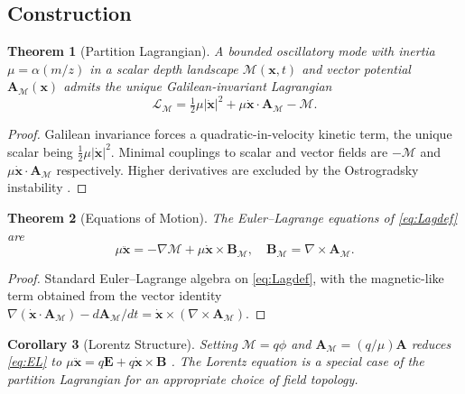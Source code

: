 \documentclass[twocolumn,10pt,a4paper]{article}
\theoremstyle{thmstyle}
\newtheorem{theorem}{Theorem}[section]
\newtheorem{corollary}[theorem]{Corollary}
\theoremstyle{definition}
\theoremstyle{remark}
\newcommand{\Depth}{\mathcal{M}}
\newcommand{\Lagr}{\mathcal{L}}
\newcommand{\partinert}{\mu}
\newcommand{\Apartition}{\mathbf{A}_{\Depth}}
\begin{document}
\subsection{Construction}

\begin{theorem}[Partition Lagrangian]
\label{thm:Lag}
A bounded oscillatory mode with inertia $\partinert=\alpha(m/z)$ in a
scalar depth landscape $\Depth(\mathbf{x},t)$ and vector potential
$\Apartition(\mathbf{x})$ admits the unique Galilean-invariant
Lagrangian
\begin{equation}
\boxed{\;\Lagr_{\Depth}=\tfrac{1}{2}\partinert|\dot{\mathbf{x}}|^{2}
+\partinert\dot{\mathbf{x}}\cdot\Apartition-\Depth.\;}
\label{eq:Lagdef}
\end{equation}
\end{theorem}

\begin{proof}
Galilean invariance forces a quadratic-in-velocity kinetic term, the
unique scalar being $\tfrac{1}{2}\partinert|\dot{\mathbf{x}}|^{2}$.
Minimal couplings to scalar and vector fields are $-\Depth$ and
$\partinert\dot{\mathbf{x}}\cdot\Apartition$ respectively. Higher
derivatives are excluded by the Ostrogradsky instability
\citep{ostrogradsky1850}.
\end{proof}

\begin{theorem}[Equations of Motion]
\label{thm:EOM}
The Euler--Lagrange equations of \eqref{eq:Lagdef} are
\begin{equation}
\partinert\ddot{\mathbf{x}}=-\nabla\Depth
+\partinert\dot{\mathbf{x}}\times\mathbf{B}_{\Depth},
\quad
\mathbf{B}_{\Depth}=\nabla\times\Apartition.
\label{eq:EL}
\end{equation}
\end{theorem}

\begin{proof}
Standard Euler--Lagrange algebra on \eqref{eq:Lagdef}, with the
magnetic-like term obtained from the vector identity
$\nabla(\dot{\mathbf{x}}\cdot\Apartition)-d\Apartition/dt
=\dot{\mathbf{x}}\times(\nabla\times\Apartition)$.
\end{proof}

\begin{corollary}[Lorentz Structure]
\label{cor:lor}
Setting $\Depth=q\phi$ and $\Apartition=(q/\partinert)\mathbf{A}$
reduces \eqref{eq:EL} to
$\partinert\ddot{\mathbf{x}}=q\mathbf{E}+q\dot{\mathbf{x}}\times\mathbf{B}$
\citep{jackson1999}. The Lorentz equation is a special case of the
partition Lagrangian for an appropriate choice of field topology.
\end{corollary}
\end{document}
